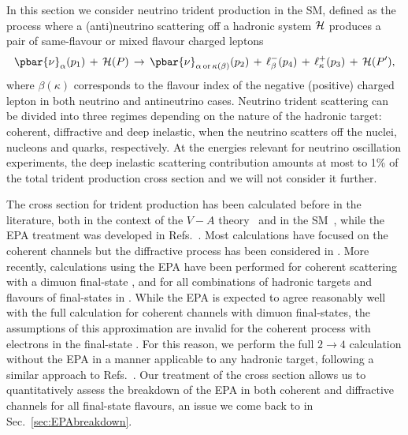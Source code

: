 In this section we consider neutrino trident production in the SM, defined as the process where a (anti)neutrino scattering off a hadronic system ${\cal H}$ produces a pair of same-flavour or mixed flavour charged leptons 
%
\begin{equation}
\pbar{\nu}_{\alpha}(p_1) \,+\, {\cal H}(P) \,\to\, \pbar{\nu}_{\alpha\, {\rm or}\, \kappa(\beta)} (p_2) \,+\, \ell_\beta^- (p_4)  \,+\, \ell_\kappa^+ (p_3) \,+\, {\cal H}(P^\prime),
\label{eq:indices}
\end{equation}
%
where $\beta (\kappa)$ corresponds to the flavour index of the negative (positive) charged lepton in both neutrino and antineutrino cases. 
%
Neutrino trident scattering can be divided into three regimes depending on the nature of the hadronic target: coherent, diffractive and deep inelastic, when the neutrino scatters off the nuclei, nucleons and quarks, respectively. At the energies relevant for neutrino oscillation experiments, the deep inelastic scattering contribution amounts at most to 1\% of the total trident production cross section \cite{Magill:2016hgc} and we will not consider it further.

The cross section for trident production has been calculated before in the literature, both in the context of the $V-A$ theory~\cite{Czyz:1964zz,Lovseth:1971vv,Fujikawa:1971nx} and in the SM~\cite{Brown:1973ih}, while the EPA treatment was developed in Refs.~\cite{Kozhushner:1962aa,Shabalin:1963aa,Belusevic:1987cw}. Most calculations have focused on the coherent channels \cite{Czyz:1964zz,Lovseth:1971vv,Fujikawa:1971nx,Brown:1973ih,Belusevic:1987cw} but the diffractive process has been considered in \cite{Czyz:1964zz,Lovseth:1971vv}. More recently, calculations using the EPA have been performed for coherent scattering with a dimuon final-state \cite{Altmannshofer:2014pba}, and for all combinations of hadronic targets and flavours of final-states in \cite{Magill:2016hgc}. While the EPA is expected to agree reasonably well with the full calculation for coherent channels with dimuon final-states, the assumptions of this approximation are invalid for the coherent process with electrons in the final-state \cite{Kozhushner:1962aa,Shabalin:1963aa,Czyz:1964zz}. 
%
For this reason, we perform the full $2\to 4$ calculation without the EPA in a manner applicable to any hadronic target, following a similar approach to Refs.~\cite{Czyz:1964zz,Lovseth:1971vv}. Our treatment of the cross section allows us to quantitatively assess the breakdown of the EPA in both coherent and diffractive channels for all final-state flavours, an issue we come back to in Sec.~\ref{sec:EPAbreakdown}.

